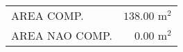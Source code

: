\documentclass[10pt]{article}
\begin{document}
\begin{tabular}{l r}
\hline
AREA COMP. & $138.00$ m$^2$ \\
AREA NAO COMP. & $0.00$ m$^2$ \\
\hline
\end{tabular}
\end{document}
